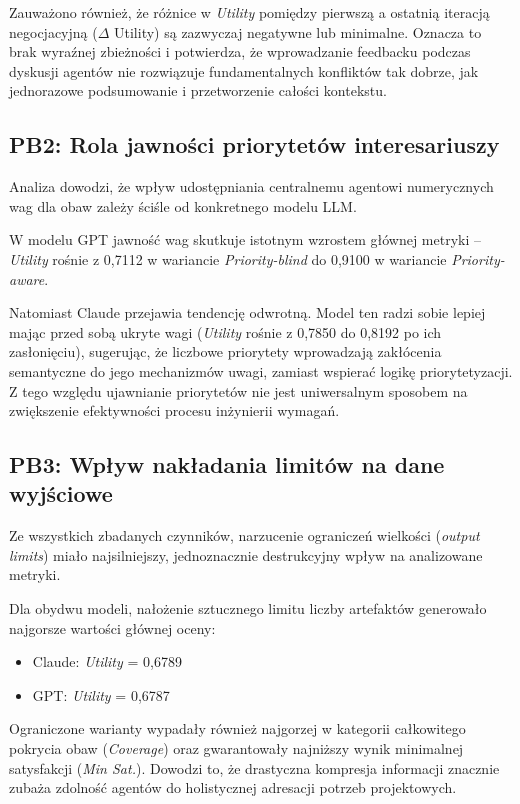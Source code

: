 \documentclass[conference]{IEEEtran}
\begin{document}
Zauważono również, że różnice w \textit{Utility} pomiędzy pierwszą a ostatnią iteracją negocjacyjną ($\Delta$ Utility) są zazwyczaj negatywne lub minimalne. Oznacza to brak wyraźnej zbieżności i potwierdza, że wprowadzanie feedbacku podczas dyskusji agentów nie rozwiązuje fundamentalnych konfliktów tak dobrze, jak jednorazowe podsumowanie i przetworzenie całości kontekstu.

\subsection{PB2: Rola jawności priorytetów interesariuszy}

Analiza dowodzi, że wpływ udostępniania centralnemu agentowi numerycznych wag dla obaw zależy ściśle od konkretnego modelu LLM.

W modelu GPT jawność wag skutkuje istotnym wzrostem głównej metryki – \textit{Utility} rośnie z 0,7112 w wariancie \textit{Priority-blind} do 0,9100 w wariancie \textit{Priority-aware}. 

Natomiast Claude przejawia tendencję odwrotną. Model ten radzi sobie lepiej mając przed sobą ukryte wagi (\textit{Utility} rośnie z 0,7850 do 0,8192 po ich zasłonięciu), sugerując, że liczbowe priorytety wprowadzają zakłócenia semantyczne do jego mechanizmów uwagi, zamiast wspierać logikę priorytetyzacji. Z tego względu ujawnianie priorytetów nie jest uniwersalnym sposobem na zwiększenie efektywności procesu inżynierii wymagań.

\subsection{PB3: Wpływ nakładania limitów na dane wyjściowe}

Ze wszystkich zbadanych czynników, narzucenie ograniczeń wielkości (\textit{output limits}) miało najsilniejszy, jednoznacznie destrukcyjny wpływ na analizowane metryki.

Dla obydwu modeli, nałożenie sztucznego limitu liczby artefaktów generowało najgorsze wartości głównej oceny:

\begin{itemize}
\item Claude: \textit{Utility} = 0,6789
\item GPT: \textit{Utility} = 0,6787
\end{itemize}

Ograniczone warianty wypadały również najgorzej w kategorii całkowitego pokrycia obaw (\textit{Coverage}) oraz gwarantowały najniższy wynik minimalnej satysfakcji (\textit{Min Sat.}). Dowodzi to, że drastyczna kompresja informacji znacznie zubaża zdolność agentów do holistycznej adresacji potrzeb projektowych.
\end{document}

